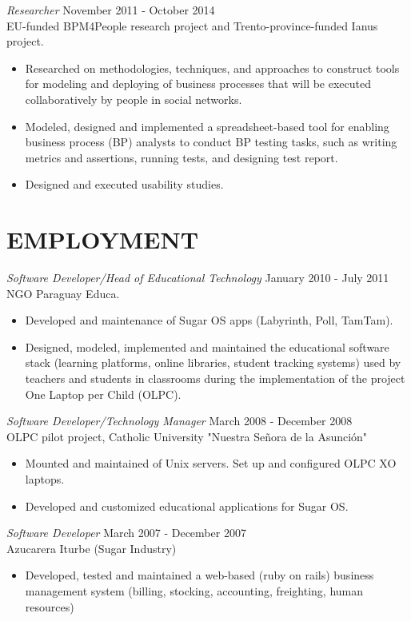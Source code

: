 \documentclass[line,margin]{res}
\begin{document}
\begin{resume}
{\sl Researcher} \hfill November 2011 - October 2014 \\
EU-funded BPM4People research project and Trento-province-funded Ianus project.
\begin{itemize}  \itemsep -2pt %
\item Researched on methodologies, techniques, and approaches to construct tools for modeling and deploying of business processes that will be executed collaboratively by people in social networks.
\item Modeled, designed and implemented a spreadsheet-based tool for enabling business process (BP) analysts to conduct BP testing tasks, such as writing metrics and assertions, running tests, and designing test report.
\item Designed and executed usability studies.
\end{itemize}

\section{EMPLOYMENT} 
{\sl Software Developer/Head of Educational Technology} \hfill January 2010 - July 2011 \\
NGO Paraguay Educa. 
\begin{itemize}  \itemsep -2pt %
\item Developed and maintenance of Sugar OS apps (Labyrinth, Poll, TamTam).
\item Designed, modeled, implemented and maintained the educational software stack (learning platforms, online libraries, student tracking systems) used by teachers and students in classrooms during the implementation of the project One Laptop per Child (OLPC).
\end{itemize}
 
{\sl Software Developer/Technology Manager} \hfill        March 2008 - December 2008 \\
OLPC pilot project, Catholic University "Nuestra Se\~nora de la Asunci\'on" 
\begin{itemize}  \itemsep -2pt %
	\item Mounted and maintained of Unix servers. Set up and configured OLPC XO laptops. 
	\item Developed and customized educational applications for Sugar OS.
\end{itemize} 
     
{\sl Software Developer} \hfill        March 2007 - December 2007 \\
Azucarera Iturbe (Sugar Industry)
\begin{itemize}
	\item Developed, tested and maintained a web-based (ruby on rails) business management system (billing, stocking, accounting, freighting, human resources)
\end{itemize} 
 

\end{resume}
\end{document}
